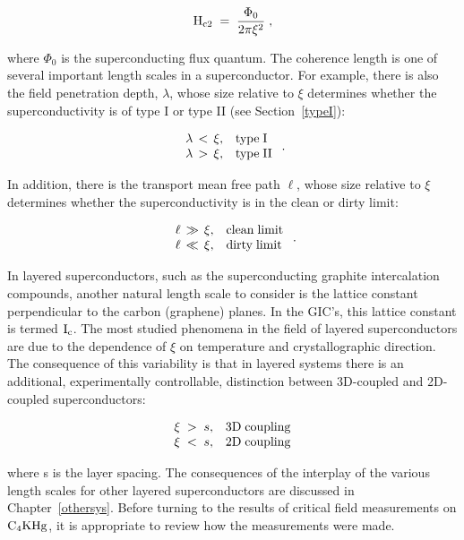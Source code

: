 \begin{equation}
\rm H_{c2}\; = \; \frac{\Phi_0}{2\pi \xi^2} \; ,
\label{cohlen}
\end{equation}

\noindent where  $\Phi_0$   is   the  superconducting    flux   
quantum.\cite{tinkham80} The coherence length  is one of  several important
length scales  in a superconductor.  For example,  there  is also the field
penetration  depth, $\lambda$,  whose  size  relative to  $\xi$  determines
whether  the    superconductivity   is   of type  I     or  type  II   (see
Section~\ref{typeI}):

\[ \begin{array}{ll}
\lambda \, < \, \xi, & \rm type \;  I \\
\lambda \, > \, \xi, & \rm type \; II
   \end{array} \; .
\]

\noindent In addition,  there is the  transport mean free  path
$\ell$,  whose    size   relative   to    $\xi$   determines  whether   the
superconductivity  is   in    the   clean  or   dirty  limit:

\[ \begin{array}{ll}
\ell \, \gg \, \xi, & \rm clean \; limit \\
\ell \, \ll \, \xi, & \rm dirty \; limit 
   \end{array} \; .
\]

\noindent In  layered superconductors,   such   as  the  superconducting   
graphite intercalation compounds, another natural  length scale to consider
is the lattice constant perpendicular to the  carbon (graphene) planes.  In
the  GIC's, this lattice  constant is  termed $\rm I_c$.   The most studied
phenomena in the field of layered superconductors are due to the dependence
of $\xi$ on temperature and crystallographic direction.  The consequence of
this variability  is  that in  layered  systems  there  is  an  additional,
experimentally controllable, distinction between 3D-coupled  and 2D-coupled
superconductors:

\[ \begin{array}{ll}
\xi \; > \; s, & \rm 3D \; coupling\\
\xi \; < \; s, & \rm 2D \; coupling
   \end{array}
\]

\noindent where s is the layer spacing. The consequences of   the interplay of  the  various
length  scales    for other layered   superconductors  are   discussed   in
Chapter~\ref{othersys}.  Before turning to  the  results of critical  field
measurements  on   $\rm  C_4KHg$, it is  appropriate  to  review  how the
measurements were made.



